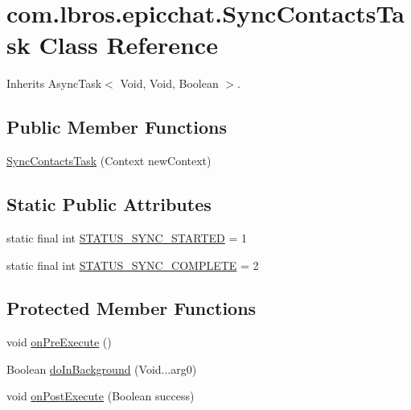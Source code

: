 \hypertarget{classcom_1_1lbros_1_1epicchat_1_1_sync_contacts_task}{\section{com.\-lbros.\-epicchat.\-Sync\-Contacts\-Task Class Reference}
\label{classcom_1_1lbros_1_1epicchat_1_1_sync_contacts_task}
}


Inherits Async\-Task$<$ Void, Void, Boolean $>$.

\subsection*{Public Member Functions}
\begin{DoxyCompactItemize}
\item 
\hyperlink{classcom_1_1lbros_1_1epicchat_1_1_sync_contacts_task_ae1e38489f338eb74840045ffb4a955ab}{Sync\-Contacts\-Task} (Context new\-Context)
\end{DoxyCompactItemize}
\subsection*{Static Public Attributes}
\begin{DoxyCompactItemize}
\item 
static final int \hyperlink{classcom_1_1lbros_1_1epicchat_1_1_sync_contacts_task_a0da5abdb285b263735b0d237b8265e97}{S\-T\-A\-T\-U\-S\-\_\-\-S\-Y\-N\-C\-\_\-\-S\-T\-A\-R\-T\-E\-D} = 1
\item 
static final int \hyperlink{classcom_1_1lbros_1_1epicchat_1_1_sync_contacts_task_a09a66dc065eaf8d14c34b93dac145f65}{S\-T\-A\-T\-U\-S\-\_\-\-S\-Y\-N\-C\-\_\-\-C\-O\-M\-P\-L\-E\-T\-E} = 2
\end{DoxyCompactItemize}
\subsection*{Protected Member Functions}
\begin{DoxyCompactItemize}
\item 
void \hyperlink{classcom_1_1lbros_1_1epicchat_1_1_sync_contacts_task_a559e57000b4d04ce625b509b0fd39da9}{on\-Pre\-Execute} ()
\item 
Boolean \hyperlink{classcom_1_1lbros_1_1epicchat_1_1_sync_contacts_task_a8f16c26a096277f99549f8fc01cb8756}{do\-In\-Background} (Void...\-arg0)
\item 
void \hyperlink{classcom_1_1lbros_1_1epicchat_1_1_sync_contacts_task_a69ec1e4b363d8f08ff4432fcc271fd03}{on\-Post\-Execute} (Boolean success)
\end{DoxyCompactItemize}


